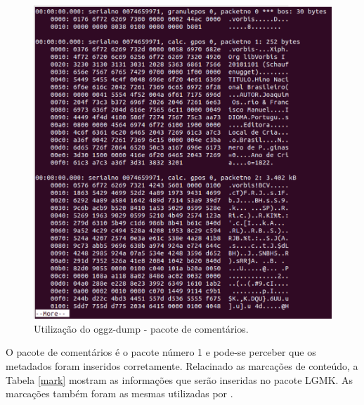  \begin{figure}[ht]
	\centering
		\includegraphics[keepaspectratio=true,scale=0.4]{figuras/hnbogg.eps}
	\caption{Utilização do oggz-dump - pacote de comentários.}
	\label{meta}
\end{figure}

O pacote de comentários é o pacote número 1 e pode-se perceber que os metadados foram inseridos corretamente. Relacinado as marcações de conteúdo,  a Tabela \ref{mark} mostram as informações que serão inseridas no pacote LGMK. As marcações também foram as mesmas utilizadas por \cite{herbert}.

